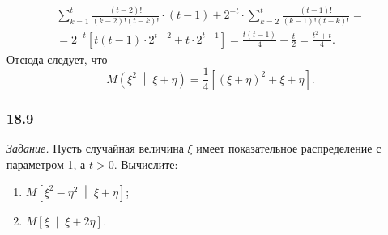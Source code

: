 \begin{enumerate}[label=\alph*)]
\begin{equation*}
\begin{split}
      \sum \limits_{k = 1}^t
        \frac{ \left( t - 2 \right)!}{ \left( k - 2 \right)! \left( t - k \right)!} \cdot
      \left( t - 1 \right) +
      2^{-t} \cdot
      \sum \limits_{k = 2}^t
        \frac{ \left( t - 1 \right)!}{ \left( k - 1 \right)! \left( t - k \right)!} = \\
      = 2^{-t} \left[ t \left( t - 1 \right) \cdot 2^{t - 2} + t \cdot 2^{t - 1} \right] =
      \frac{t \left( t - 1 \right) }{4} + \frac{t}{2} =
      \frac{t^2 + t}{4}.
    \end{split}
  \end{equation*}
  Отсюда следует, что
  $$M \left( \xi^2 \; \middle| \; \xi + \eta \right) =
    \frac{1}{4} \left[ \left( \xi + \eta \right)^2 + \xi + \eta \right].$$
\end{enumerate}

\subsubsection*{18.9}

\textit{Задание.}
Пусть случайная величина $ \xi $ имеет показательное распределение с параметром 1, а $t > 0$.
Вычислите:
\begin{enumerate}[label=\alph*)]
  \item $M \left[ \xi^2 - \eta^2 \; \middle| \; \xi + \eta \right] $;
  \item $M \left[ \xi \; \middle| \; \xi + 2 \eta \right] $.
\end{enumerate}

